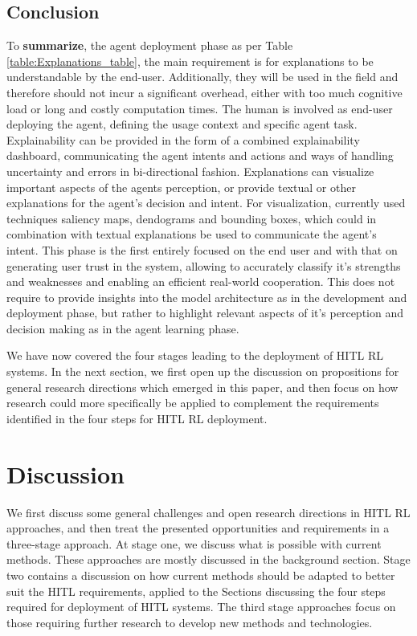 \documentclass[twoside,11pt]{article}
\begin{document}
\begin{enumerate}
\subsection{Conclusion}

\noindent To \textbf{summarize}, the agent deployment phase as per Table \ref{table:Explanations_table}, the main requirement is for explanations to be understandable by the end-user. Additionally, they will be used in the field and therefore should not incur a significant overhead, either with  too much cognitive load or long and costly computation times. The human is involved as end-user deploying the agent, defining the usage context and specific agent task. Explainability can be provided in the form of a combined explainability dashboard, communicating the agent intents and actions and ways of handling uncertainty and errors in bi-directional fashion. Explanations can visualize important aspects of the agents perception, or provide textual or other explanations for the agent's decision and intent. For visualization, currently used techniques saliency maps, dendograms and bounding boxes, which could in combination with textual explanations be used to communicate the agent's intent. This phase is the first entirely focused on the end user and with that on generating user trust in the system, allowing to accurately classify it's strengths and weaknesses and enabling an efficient real-world cooperation. This does not require to provide insights into the model architecture as in the development and deployment phase, but rather to highlight relevant aspects of it's perception and decision making as in the agent learning phase.

We have now covered the four stages leading to the deployment of HITL RL systems. In the next section, we first open up the discussion on propositions for general research directions which emerged in this paper, and then focus on how research could more specifically be applied to complement the requirements identified in the four steps for HITL RL deployment.

\section{Discussion}
\label{sec:discussion}
We first discuss some general challenges and open research directions in HITL RL approaches, and then treat the presented opportunities and requirements in a three-stage approach. At stage one, we discuss what is possible with current methods. These approaches are mostly discussed in the background section. Stage two contains a discussion on how current methods should be adapted to better suit the HITL requirements, applied to the Sections discussing the four steps required for deployment of HITL systems. The third stage approaches focus on those requiring further research to develop new methods and technologies.


\end{enumerate}
\end{document}
